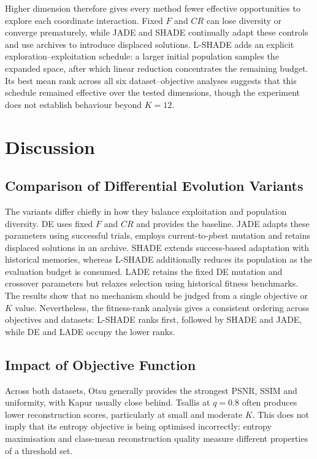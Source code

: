 \documentclass[review]{elsarticle}
\begin{document}
Higher dimension therefore gives every method fewer effective opportunities
to explore each coordinate interaction. Fixed $F$ and $CR$ can lose diversity
or converge prematurely, while JADE and SHADE continually adapt these controls
and use archives to introduce displaced solutions. L-SHADE adds an explicit
exploration--exploitation schedule: a larger initial population samples the
expanded space, after which linear reduction concentrates the remaining
budget. Its best mean rank across all six dataset--objective analyses suggests
that this schedule remained effective over the tested dimensions, though the
experiment does not establish behaviour beyond $K=12$.





\section{Discussion}
\label{sec:discussion}



\subsection{Comparison of Differential Evolution Variants}

The variants differ chiefly in how they balance exploitation and
population diversity. DE uses fixed $F$ and $CR$ and provides the
baseline. JADE adapts these parameters using successful trials, employs
current-to-$p$best mutation and retains displaced solutions in an
archive. SHADE extends success-based adaptation with historical memories,
whereas L-SHADE additionally reduces its population as the evaluation
budget is consumed. LADE retains the fixed DE mutation and crossover
parameters but relaxes selection using historical fitness benchmarks.
The results show that no mechanism should be judged from a single
objective or $K$ value. Nevertheless, the fitness-rank analysis gives a
consistent ordering across objectives and datasets: L-SHADE ranks first,
followed by SHADE and JADE, while DE and LADE occupy the lower ranks.


\subsection{Impact of Objective Function}

Across both datasets, Otsu generally provides the strongest PSNR, SSIM
and uniformity, with Kapur usually close behind. Tsallis at $q=0.8$
often produces lower reconstruction scores, particularly at small and
moderate $K$. This does not imply that its entropy objective is being
optimised incorrectly: entropy maximisation and class-mean reconstruction
quality measure different properties of a threshold set.
\end{document}
